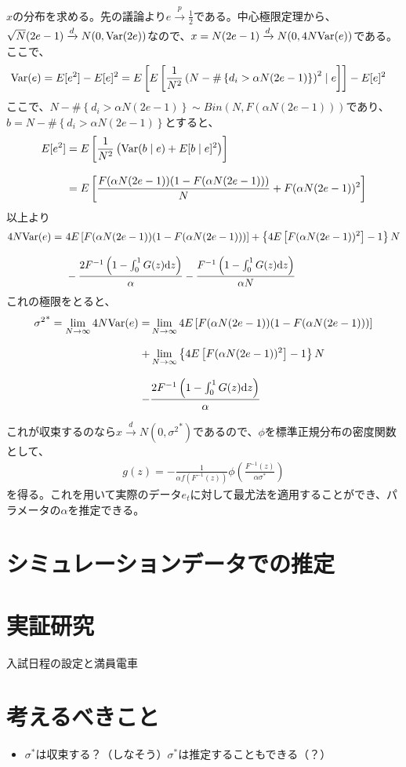 \documentclass{jsarticle}
\begin{document}
$x$の分布を求める。先の議論より$e \xrightarrow[]{p} \frac{1}{2}$である。中心極限定理から、$\sqrt{N}(2e - 1) \xrightarrow[]{d} N(0, {\rm Var}(2e))$なので、$x = N(2e - 1) \xrightarrow[]{d} N(0, 4N{\rm Var}(e))$である。ここで、
\begin{align*}
	{\rm Var}(e) &= E[e^2] - E[e]^2 = E\left[ E\left[ \frac{1}{N^2} \left( N - \# \left\{ d_i > \alpha N (2e-1) \right\} \right)^2 \mid e \right] \right] - E[e]^2
\end{align*}
ここで、$N - \# \left\{ d_i > \alpha N (2e-1) \right\} \sim Bin(N, F(\alpha N (2e-1)))$であり、$b = N - \# \left\{ d_i > \alpha N (2e-1) \right\}$とすると、
\begin{align*}
	E[e^2] &= E\left[ \frac{1}{N^2} \left( {\rm Var}(b \mid e) + E[b \mid e]^2 \right) \right]\\[8pt]
	&= E\left[ \frac{F(\alpha N (2e-1)) (1 - F(\alpha N (2e-1)))}{N} + F(\alpha N (2e-1))^2 \right]
\end{align*}
以上より
\begin{align*}
	4N{\rm Var}(e) =\ &4E\left[F(\alpha N (2e-1)) (1 - F(\alpha N (2e-1)))\right] + \left\{ 4E\left[ F(\alpha N (2e-1))^2 \right]- 1\right\}N\\[8pt]
	& - \frac{2F^{-1}\left( 1 - \int_0^1 G(z) \mathrm{d}z \right)}{\alpha} - \frac{F^{-1}\left( 1 - \int_0^1 G(z) \mathrm{d}z \right)}{\alpha N}
\end{align*}
これの極限をとると、
\begin{align*}
	{\sigma^2}^* = \lim_{N \to \infty} 4N{\rm Var}(e) = &\lim_{N \to \infty} 4E\left[F(\alpha N (2e-1)) (1 - F(\alpha N (2e-1)))\right]\\[8pt]
	 + &\lim_{N \to \infty} \left\{ 4E\left[ F(\alpha N (2e-1))^2 \right]- 1\right\}N\\[8pt]
	  - &\frac{2F^{-1}\left( 1 - \int_0^1 G(z) \mathrm{d}z \right)}{\alpha}
\end{align*}

これが収束するのなら$x  \xrightarrow[]{d} N(0, {\sigma^2}^*)$であるので、$\phi$を標準正規分布の密度関数として、
\begin{align*}
	g(z) = -\frac{1}{\alpha f \left(F^{-1}(z)\right)} \phi \left( \frac{F^{-1}(z)}{\alpha \sigma^*} \right) 
\end{align*}
を得る。これを用いて実際のデータ${e_t}$に対して最尤法を適用することができ、パラメータの$\alpha$を推定できる。

\section{シミュレーションデータでの推定}

\section{実証研究}
入試日程の設定と満員電車

\section{考えるべきこと}
\begin{itemize}
	\item $\sigma^*$は収束する？（しなそう）$\sigma^*$は推定することもできる（？）
\end{itemize}
\end{document}
